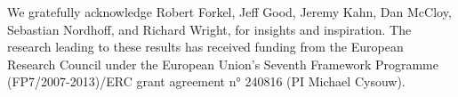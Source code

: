 \begin{refsection}

We gratefully acknowledge Robert Forkel, Jeff Good, Jeremy Kahn, Dan McCloy, Sebastian Nordhoff, and Richard Wright, for insights and inspiration. The research leading to these results has received funding from the European Research Council under the European Union's Seventh Framework Programme (FP7/2007-2013)/ERC grant agreement n° 240816 (PI Michael Cysouw).

\printbibliography[heading=subbibliography]
\end{refsection}

